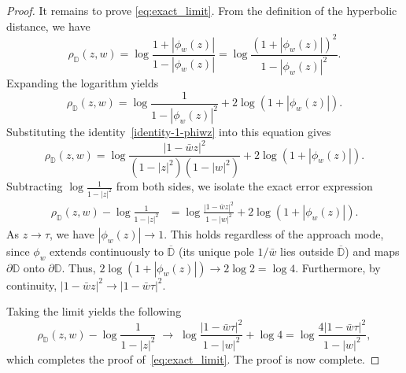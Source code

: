 \documentclass[10pt,a4paper]{amsart}
\numberwithin{equation}{section}
\begin{document}
\begin{proof}
\noindent
It remains to prove \eqref{eq:exact_limit}. From the definition of the hyperbolic distance, we have
\begin{equation*}
\rho_{\mathbb{D}}(z,w) = \log\frac{1+|\phi_w(z)|}{1-|\phi_w(z)|} = \log\frac{(1+|\phi_w(z)|)^2}{1-|\phi_w(z)|^2}.
\end{equation*}
Expanding the logarithm yields
\begin{equation*}
\rho_{\mathbb{D}}(z,w) = \log\frac{1}{1-|\phi_w(z)|^2} + 2\log(1+|\phi_w(z)|).
\end{equation*}
Substituting the identity~\eqref{identity-1-phiwz} into this equation gives
\begin{equation*}
\rho_{\mathbb{D}}(z,w) = \log\frac{|1-\bar{w}z|^2}{(1-|z|^2)(1-|w|^2)} + 2\log(1+|\phi_w(z)|).
\end{equation*}
Subtracting $\log\frac{1}{1-|z|^2}$ from both sides, we isolate the exact error expression
\begin{align*}
\rho_{\mathbb{D}}(z,w) - \log\frac{1}{1-|z|^2}
&= \log\frac{|1-\bar{w}z|^2}{1-|w|^2} + 2\log(1+|\phi_w(z)|).
\end{align*}
As $z\to\tau$, we have $|\phi_w(z)|\to 1$. This holds regardless of the approach mode, since $\phi_w$ extends continuously to $\overline{\mathbb{D}}$ (its unique pole $1/\bar w$ lies outside $\overline{\mathbb{D}}$) and maps $\partial\mathbb{D}$ onto $\partial\mathbb{D}$. Thus, $2\log(1+|\phi_w(z)|)\to 2\log 2 = \log 4$. Furthermore, by continuity, $|1-\bar{w}z|^2 \to |1-\bar{w}\tau|^2$.

Taking the limit yields the following
\begin{equation*}
\rho_{\mathbb{D}}(z,w) - \log\frac{1}{1-|z|^2}
\;\longrightarrow\;
\log\frac{|1-\bar{w}\tau|^2}{1-|w|^2} + \log 4
= \log\frac{4|1-\bar{w}\tau|^2}{1-|w|^2},
\end{equation*}
which completes the proof of~\eqref{eq:exact_limit}. The proof is now complete.
\end{proof}
\end{document}
